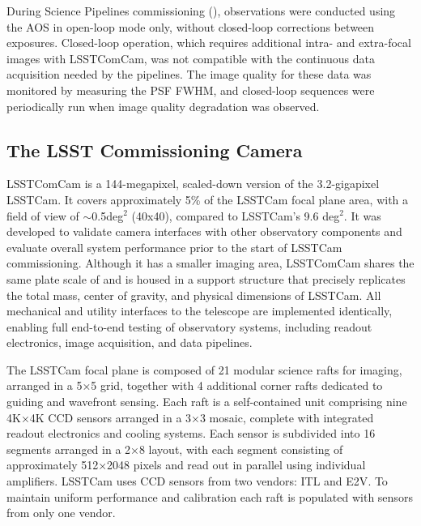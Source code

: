 During Science Pipelines commissioning (),  observations were conducted using the AOS in open-loop mode only, without closed-loop corrections between exposures. 
Closed-loop operation, which requires additional intra- and extra-focal images with LSSTComCam, was not compatible with the continuous data acquisition needed by the pipelines.
The image quality for these data was monitored by measuring the \gls{PSF} \gls{FWHM}, and closed-loop sequences were periodically run when image quality degradation was observed.

\subsection{The LSST Commissioning Camera
\label{ssec:comcam}}
\gls{LSSTComCam} \citep{2022SPIE12184E..0JS,2020SPIE11447E..0LS,2018SPIE10700E..3DH, 10.71929/rubin/2561361} is a 144-megapixel, scaled-down version of the 3.2-gigapixel \gls{LSSTCam}.
It covers approximately 5\% of the \gls{LSSTCam} focal plane area, with a  field of view of $\sim$0.5deg$^2$   (40\arcmin x40\arcmin), compared to LSSTCam's 9.6 deg$^2$. 
It was developed to validate camera interfaces with other observatory components and evaluate overall system performance prior to the start of \gls{LSSTCam} commissioning. 
Although it has a smaller imaging area, \gls{LSSTComCam} shares the same plate scale of \rawplatescale and is housed in a support structure that precisely replicates the total mass, center of gravity, and physical dimensions of \gls{LSSTCam}. 
All mechanical and utility interfaces to the telescope are implemented identically, enabling full end-to-end testing of observatory systems, including readout electronics, image acquisition, and data pipelines.

The \gls{LSSTCam} focal plane is composed  of 21 modular science rafts for imaging, arranged in a 5×5 grid, together with 4 additional corner rafts dedicated to guiding and wavefront sensing.
Each raft is a self-contained unit comprising nine 4K×4K \gls{CCD} sensors arranged in a 3×3 mosaic, complete with integrated readout electronics and cooling systems.
Each sensor is subdivided into 16 segments arranged in a 2×8 layout, with each segment consisting of approximately 512×2048 pixels and read out in parallel using individual amplifiers.
\gls{LSSTCam} uses CCD sensors from two vendors: \gls{ITL} and \gls{E2V}.
To maintain uniform performance and \gls{calibration} each raft is populated with sensors from only one vendor.

